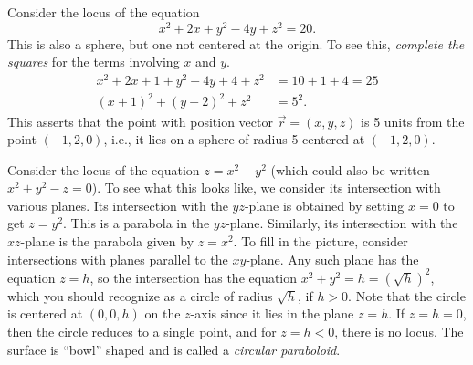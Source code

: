 \begin{example}
	Consider the locus of the equation
	\[
	  x^2 + 2x + y^2 - 4y + z^2 = 20.
	\]
	This is also a sphere, but one not centered at the origin.  To
	see this, \emph{complete the squares} for the terms involving
	$x$ and  $y$.
	\begin{align*}
	    x^2 + 2x + 1 + y^2 -4y + 4 + z^2 &= 10 + 1 + 4 = 25 \\
	    (x + 1)^2 + (y - 2)^2 + z^2 &= 5^2.
	\end{align*}
	This asserts that the point with position vector $\vec r = ( x, y, z )$
	is 5 units from the point $(-1, 2, 0)$, i.e., it lies on a sphere
	of radius 5 centered at $(-1, 2, 0)$.
\end{example}

\begin{example}
	Consider the locus of the equation $z = x^2 + y^2$ (which could
	also be written $x^2 + y^2 - z = 0$).  To see what this looks like,
	we consider its intersection with various planes.   Its intersection
	with the $yz$-plane is obtained by setting $x = 0$ to get
	$z = y^2$.  This is a parabola in the $yz$-plane.  
	Similarly, its intersection with the $xz$-plane is the parabola
	given by $z = x^2$.   To fill in the picture,  consider
	intersections with planes parallel to the $xy$-plane.  Any
	such plane has the equation $z = h$, so the intersection has the equation
	$x^2 + y^2 = h = (\sqrt h)^2$, which you should recognize as a circle
	of radius $\sqrt h$, if $h > 0$.  Note that the circle is
	centered at $(0,0,h)$ on the $z$-axis since it lies in the plane $z = h$.
	If $z = h = 0$, then the circle reduces to a single point, and for 
	$z = h < 0$, there is no locus.
	The surface is ``bowl'' shaped and is called a \emph{circular
	paraboloid}.

	\begin{center}
	\end{center}
\end{example}

